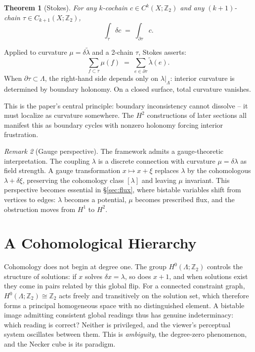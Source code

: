 \documentclass[11pt]{amsart}  %
\theoremstyle{plain}
\newtheorem{theorem}{Theorem}[section]
\theoremstyle{definition}
\theoremstyle{remark}
\newtheorem{remark}[theorem]{Remark}
\newcommand{\style}[1]{{\em #1}} %
\newcommand{\coboundary}{\delta} %
\newcommand{\Z}{\mathbb{Z}} %
\newcommand{\cgraph}{\Lambda} %
\newcommand{\coupling}{\lambda} %
\begin{document}
\begin{theorem}[Stokes]
\label{thm:stokes}
For any $k$-cochain $c \in C^k(X; \Z_2)$ and any $(k+1)$-chain $\tau \in C_{k+1}(X; \Z_2)$,
\[
\int_\tau \coboundary c \;=\; \int_{\partial\tau} c .
\]
\end{theorem}

Applied to curvature $\mu = \coboundary\tilde\coupling$ and a 2-chain $\tau$, Stokes asserts:
\[
\sum_{f \subset \tau} \mu(f) \;=\; \sum_{e \in \partial\tau} \tilde\coupling(e).
\]
When $\partial\tau \subset \cgraph$, the right-hand side depends only on $\coupling|_\cgraph$: interior curvature is determined by boundary holonomy. On a closed surface, total curvature vanishes.

This is the paper's central principle: boundary inconsistency cannot dissolve -- it must localize as curvature somewhere. The $H^2$ constructions of later sections all manifest this as boundary cycles with nonzero holonomy forcing interior frustration.


\begin{remark}[Gauge perspective]
\label{rem:gauge}
The framework admits a gauge-theoretic interpretation. The coupling $\coupling$ is a discrete connection with curvature $\mu = \coboundary\coupling$ as field strength. A gauge transformation $x \mapsto x + \xi$ replaces $\coupling$ by the cohomologous $\coupling + \coboundary\xi$, preserving the cohomology class $[\coupling]$ and leaving $\mu$ invariant. This perspective becomes essential in \S\ref{sec:flux}, where bistable variables shift from vertices to edges: $\coupling$ becomes a potential, $\mu$ becomes prescribed flux, and the obstruction moves from $H^1$ to $H^2$.
\end{remark}


\section{A Cohomological Hierarchy}
\label{sec:hierarchy}

Cohomology does not begin at degree one. The group $H^0(\cgraph; \Z_2)$ 
controls the structure of solutions: if $x$ solves $\coboundary x = \coupling$, 
so does $x + 1$, and when solutions exist they come in pairs related by this 
global flip. For a connected constraint graph, $H^0(\cgraph; \Z_2) \cong \Z_2$ 
acts freely and transitively on the solution set, which therefore forms a 
principal homogeneous space with no distinguished element. A bistable image 
admitting consistent global readings thus has genuine indeterminacy: which 
reading is correct? Neither is privileged, and the viewer's perceptual 
system oscillates between them. This is \style{ambiguity}, the degree-zero 
phenomenon, and the Necker cube is its paradigm.
\end{document}
